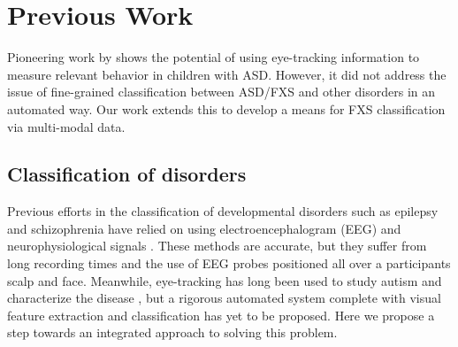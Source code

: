 \documentclass[10pt,twocolumn,letterpaper]{article}
\begin{document}
\section {Previous Work}

Pioneering work by \cite{Rehg} shows the potential of using eye-tracking information to measure relevant behavior in children with ASD. However, it did not address the issue of fine-grained classification between ASD/FXS and other disorders in an automated way. Our work extends this to develop a means for FXS classification via multi-modal data.

\subsection{Classification of disorders} Previous efforts in the classification of developmental disorders such as epilepsy and schizophrenia have relied on using electroencephalogram (EEG) and neurophysiological signals \cite{Kumar, sabeti}. These methods are accurate, but they suffer from long recording times and the use of EEG probes positioned all over a participants scalp and face. Meanwhile, eye-tracking has long been used to study autism and characterize the disease \cite{Boraston, hashemi, dalton}, but a rigorous automated system complete with visual feature extraction and classification has yet to be proposed. Here we propose a step towards an integrated approach to solving this problem. 
\end{document}
